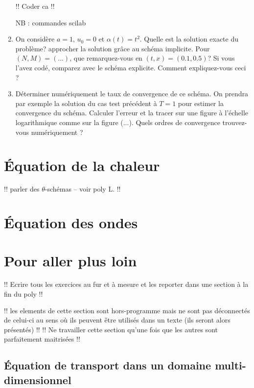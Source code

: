 \documentclass[12pt,a4paper,twoside]{article}
\begin{document}
\begin{exercise}
\begin{enumerate}
    !! Coder ca !!

    NB : commandes scilab


  \item On consid\`ere $a=1$, $u_0 = 0$ et $\alpha(t) = t^2$.
    Quelle est la solution exacte du probl\`eme?
    approcher la solution gr\^ace au sch\'ema implicite.
    Pour $(N,M) = (...)$, que remarquez-vous en $(t,x)=(0.1,0.5)$?
    Si vous l'avez cod\'e, comparez avec le sch\'ema explicite.
    Comment expliquez-vous ceci ?
    
  \item D\'eterminer num\'eriquement le taux de convergence de ce sch\'ema.
    On prendra par exemple la solution du cas test pr\'ec\'edent \`a $T=1$ pour
    estimer la convergence du sch\'ema. Calculer l'erreur et la tracer sur une figure
    \`a l'\'echelle logarithmique comme sur la figure (...).
    Quels ordres de convergence trouvez-vous num\'eriquement ?
  \end{enumerate}

\end{exercise}


\section{\'Equation de la chaleur}

!! parler des $\theta$-sch\'emas -- voir poly L. !!

\section{\'Equation des ondes}


\section{Pour aller plus loin}

!! Ecrire tous les exercices au fur et \`a mesure et les reporter
dans une section \`a la fin du poly !!


!! les elements de cette section sont hors-programme mais ne sont pas 
d\'econnect\'es de celui-ci au sens o\`u ils peuvent \^etre utilis\'es 
dans un texte (ils seront alors pr\'esent\'es) !!
!! Ne travailler cette section qu'une fois que les autres sont parfaitement maitris\'ees !!

\subsection{\'Equation de transport dans un domaine multi-dimensionnel}
\label{subsec:transport_multiD}


\end{document}
